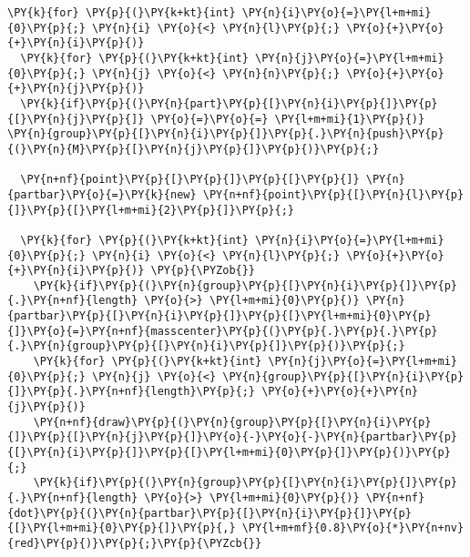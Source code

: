 \begin{Verbatim}[commandchars=\\\{\}]
  \PY{k}{for} \PY{p}{(}\PY{k+kt}{int} \PY{n}{i}\PY{o}{=}\PY{l+m+mi}{0}\PY{p}{;} \PY{n}{i} \PY{o}{<} \PY{n}{l}\PY{p}{;} \PY{o}{+}\PY{o}{+}\PY{n}{i}\PY{p}{)}
  \PY{k}{for} \PY{p}{(}\PY{k+kt}{int} \PY{n}{j}\PY{o}{=}\PY{l+m+mi}{0}\PY{p}{;} \PY{n}{j} \PY{o}{<} \PY{n}{n}\PY{p}{;} \PY{o}{+}\PY{o}{+}\PY{n}{j}\PY{p}{)}
  \PY{k}{if}\PY{p}{(}\PY{n}{part}\PY{p}{[}\PY{n}{i}\PY{p}{]}\PY{p}{[}\PY{n}{j}\PY{p}{]} \PY{o}{=}\PY{o}{=} \PY{l+m+mi}{1}\PY{p}{)} \PY{n}{group}\PY{p}{[}\PY{n}{i}\PY{p}{]}\PY{p}{.}\PY{n}{push}\PY{p}{(}\PY{n}{M}\PY{p}{[}\PY{n}{j}\PY{p}{]}\PY{p}{)}\PY{p}{;}

  \PY{n+nf}{point}\PY{p}{[}\PY{p}{]}\PY{p}{[}\PY{p}{]} \PY{n}{partbar}\PY{o}{=}\PY{k}{new} \PY{n+nf}{point}\PY{p}{[}\PY{n}{l}\PY{p}{]}\PY{p}{[}\PY{l+m+mi}{2}\PY{p}{]}\PY{p}{;}

  \PY{k}{for} \PY{p}{(}\PY{k+kt}{int} \PY{n}{i}\PY{o}{=}\PY{l+m+mi}{0}\PY{p}{;} \PY{n}{i} \PY{o}{<} \PY{n}{l}\PY{p}{;} \PY{o}{+}\PY{o}{+}\PY{n}{i}\PY{p}{)} \PY{p}{\PYZob{}}
    \PY{k}{if}\PY{p}{(}\PY{n}{group}\PY{p}{[}\PY{n}{i}\PY{p}{]}\PY{p}{.}\PY{n+nf}{length} \PY{o}{>} \PY{l+m+mi}{0}\PY{p}{)} \PY{n}{partbar}\PY{p}{[}\PY{n}{i}\PY{p}{]}\PY{p}{[}\PY{l+m+mi}{0}\PY{p}{]}\PY{o}{=}\PY{n+nf}{masscenter}\PY{p}{(}\PY{p}{.}\PY{p}{.}\PY{p}{.}\PY{n}{group}\PY{p}{[}\PY{n}{i}\PY{p}{]}\PY{p}{)}\PY{p}{;}
    \PY{k}{for} \PY{p}{(}\PY{k+kt}{int} \PY{n}{j}\PY{o}{=}\PY{l+m+mi}{0}\PY{p}{;} \PY{n}{j} \PY{o}{<} \PY{n}{group}\PY{p}{[}\PY{n}{i}\PY{p}{]}\PY{p}{.}\PY{n+nf}{length}\PY{p}{;} \PY{o}{+}\PY{o}{+}\PY{n}{j}\PY{p}{)}
    \PY{n+nf}{draw}\PY{p}{(}\PY{n}{group}\PY{p}{[}\PY{n}{i}\PY{p}{]}\PY{p}{[}\PY{n}{j}\PY{p}{]}\PY{o}{-}\PY{o}{-}\PY{n}{partbar}\PY{p}{[}\PY{n}{i}\PY{p}{]}\PY{p}{[}\PY{l+m+mi}{0}\PY{p}{]}\PY{p}{)}\PY{p}{;}
    \PY{k}{if}\PY{p}{(}\PY{n}{group}\PY{p}{[}\PY{n}{i}\PY{p}{]}\PY{p}{.}\PY{n+nf}{length} \PY{o}{>} \PY{l+m+mi}{0}\PY{p}{)} \PY{n+nf}{dot}\PY{p}{(}\PY{n}{partbar}\PY{p}{[}\PY{n}{i}\PY{p}{]}\PY{p}{[}\PY{l+m+mi}{0}\PY{p}{]}\PY{p}{,} \PY{l+m+mf}{0.8}\PY{o}{*}\PY{n+nv}{red}\PY{p}{)}\PY{p}{;}\PY{p}{\PYZcb{}}
\end{Verbatim}
